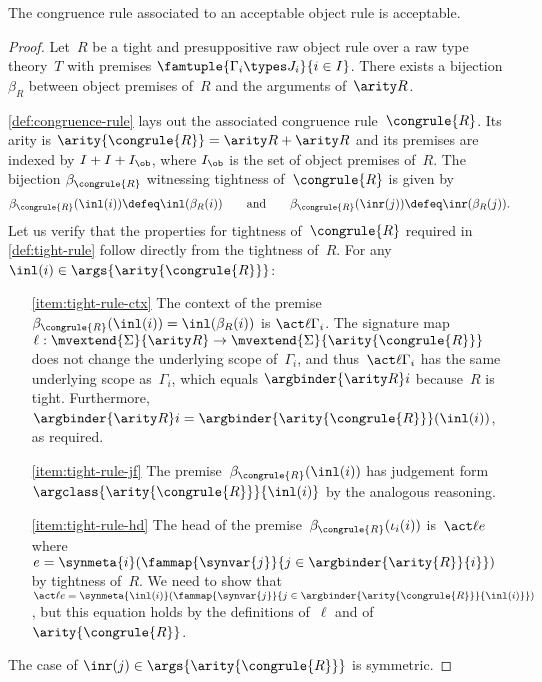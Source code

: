 \begin{proposition}
  The congruence rule associated to an acceptable object rule is acceptable.
\end{proposition}
%
\begin{proof}
  Let~$R$ be a tight and presuppositive raw object rule over a raw type theory~$T$ with premises $\famtuple{\Gamma_i \types J_i}{i \in I}$.
  There exists a bijection~$\beta_R$ between object premises of~$R$ and the arguments of~$\arity R$.

  \cref{def:congruence-rule} lays out the associated congruence rule~$\congrule{R}$. Its arity is $\arity{\congrule{R}} = \arity R + \arity R$ and its premises are indexed by $I + I + I_{\ob}$, where $I_{\ob}$ is the set of object premises of~$R$.
  The bijection $\beta_{\congrule{R}}$ witnessing tightness of~$\congrule{R}$ is given by
  \begin{equation*}
    \beta_{\congrule{R}} (\inl(i)) \defeq \inl(\beta_R(i))
    \qquad\text{and}\qquad
    \beta_{\congrule{R}} (\inr(j)) \defeq \inr(\beta_R(j)).
  \end{equation*}
  Let us verify that the properties for tightness of~$\congrule{R}$ required in \cref{def:tight-rule} follow directly from the tightness of~$R$.
  For any $\inl(i) \in  \args {\arity{\congrule{R}}}$:
  \begin{enumerate}

  \item[\eqref{item:tight-rule-ctx}] The context of the premise $\beta_{\congrule{R}}(\inl(i)) = \inl(\beta_R(i))$ is $\act \ell \Gamma_i$. The signature map~$\ell : \mvextend{\Sigma}{\arity R} \to \mvextend{\Sigma}{\arity{\congrule{R}}}$ does not change the underlying scope of~$\Gamma_i$, and thus~$\act \ell \Gamma_i$ has the same underlying scope as~$\Gamma_i$, which equals $\argbinder {\arity R} i$ because~$R$ is tight. Furthermore, $\argbinder {\arity R} i = \argbinder {\arity{\congrule{R}}} (\inl(i))$, as required.

  \item[\eqref{item:tight-rule-jf}] The premise~$\beta_{\congrule{R}}(\inl(i))$ has judgement form~$\argclass{\arity{\congrule{R}}}{\inl(i)}$ by the analogous reasoning.

  \item[\eqref{item:tight-rule-hd}] The head of the premise~$\beta_{\congrule{R}}(\iota_i(i))$ is~$\act \ell e$ where $e = \synmeta{i}(\fammap{\synvar{j}}{j \in \argbinder{\arity{R}}{i}})$ by tightness of~$R$. We need to show that $\act \ell e = \synmeta{\inl(i)}(\fammap{\synvar{j}}{j \in \argbinder{\arity{\congrule{R}}}{\inl(i)}})$, but this equation holds by the definitions of~$\ell$ and of~$\arity{\congrule{R}}$.
  \end{enumerate}
  The case of $\inr(j) \in \args {\arity{\congrule{R}}}$ is symmetric.


\end{proof}
